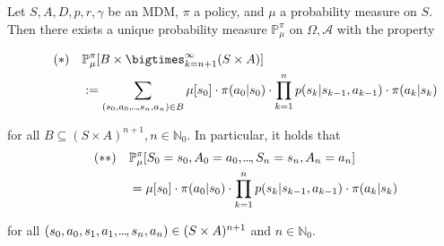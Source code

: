 \begin{theorem}
    \label{Ionescu-Tulcea}
    Let \( S,A,D,p,r,\gamma \) be an MDM, \( \pi \) a policy, and \( \mu \) a probability measure on \( S \). Then there exists a unique probability measure \( \mathbb{P}_\mu^\pi \) on \( \Omega, \mathcal{A} \) with the property 
    
    \begin{align*}\label{Ionescu-Tulcea-eq}\tag{\textasteriskcentered}
        \quad &\mathbb{P}_\mu^\pi[B \times \bigtimes_{k = n+1}^{\infty} (S \times A)] \\
         &:= \sum_{(s_{0},a_{0},\mydots,s_n,a_n) \in B} \mu[{s_{0}}] \cdot \pi(a_{0}|s_{0}) \cdot \prod_{k=1}^n p(s_k | s_{k-1}, a_{k-1}) \cdot \pi(a_{k} | s_{k})\\
    \end{align*}



    for all \( B \subseteq (S \times A)^{n+1}, n \in \mathbb{N}_0 \). In particular, it holds that 
    \begin{align*}\label{Ionescu-Tulcea-eq-2}\tag{\textasteriskcentered\textasteriskcentered}
        \quad &\mathbb{P}_\mu^\pi [S_{0}=s_{0}, A_{0} = a_{0}, \kern-0.10em.\kern-0.06em.\kern-0.06em.\kern-0.1em, S_n = s_n, A_n = a_n] \\
        &= \mu[{s_{0}}] \cdot \pi(a_{0}|s_{0})\cdot \prod_{k=1}^{n} p(s_k | s_{k-1}, a_{k-1}) \cdot \pi(a_k | s_k) \\
    \end{align*} 

    for all \( (s_{0},a_{0},s_{1},a_{1},\kern-0.10em.\kern-0.06em.\kern-0.06em.\kern-0.1em,s_n, a_n) \in (S \times A)^{n+1}\) and \( n \in \mathbb{N}_{0} \).  
\end{theorem}


